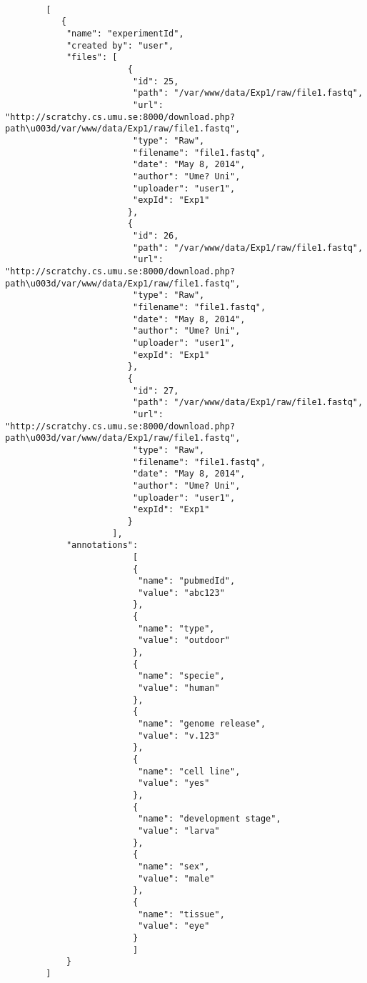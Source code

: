 \begin{verbatim}
 
        [
           {
            "name": "experimentId",
            "created by": "user",
            "files": [
                        { 
                         "id": 25,
                         "path": "/var/www/data/Exp1/raw/file1.fastq",
                         "url": "http://scratchy.cs.umu.se:8000/download.php?path\u003d/var/www/data/Exp1/raw/file1.fastq",
                         "type": "Raw",
                         "filename": "file1.fastq",
                         "date": "May 8, 2014",
                         "author": "Ume? Uni",
                         "uploader": "user1",
                         "expId": "Exp1"
                        },
                        { 
                         "id": 26,
                         "path": "/var/www/data/Exp1/raw/file1.fastq",
                         "url": "http://scratchy.cs.umu.se:8000/download.php?path\u003d/var/www/data/Exp1/raw/file1.fastq",
                         "type": "Raw",
                         "filename": "file1.fastq",
                         "date": "May 8, 2014",
                         "author": "Ume? Uni",
                         "uploader": "user1",
                         "expId": "Exp1"
                        },
                        { 
                         "id": 27,
                         "path": "/var/www/data/Exp1/raw/file1.fastq",
                         "url": "http://scratchy.cs.umu.se:8000/download.php?path\u003d/var/www/data/Exp1/raw/file1.fastq",
                         "type": "Raw",
                         "filename": "file1.fastq",
                         "date": "May 8, 2014",
                         "author": "Ume? Uni",
                         "uploader": "user1",
                         "expId": "Exp1"
                        }
                     ],
            "annotations": 
                         [
                         {
                          "name": "pubmedId",
                          "value": "abc123"
                         }, 
                         {
                          "name": "type",
                          "value": "outdoor"
                         },
                         {
                          "name": "specie",
                          "value": "human"
                         },
                         {
                          "name": "genome release",
                          "value": "v.123"
                         },
                         {
                          "name": "cell line",
                          "value": "yes"
                         },
                         {
                          "name": "development stage",
                          "value": "larva"
                         },
                         {
                          "name": "sex",
                          "value": "male"
                         },
                         {
                          "name": "tissue",
                          "value": "eye"
                         }
                         ]
            }
        ]
\end{verbatim}

